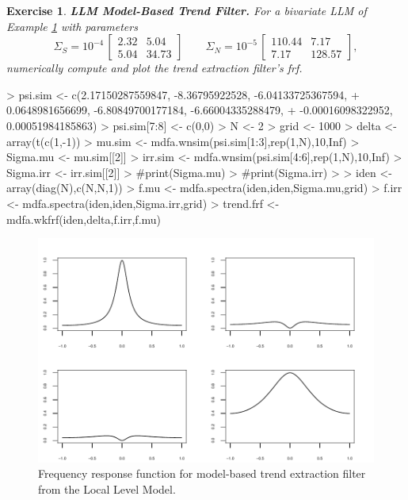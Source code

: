\documentclass[a4paper]{book}
\newtheorem{Exercise}{Exercise}
\begin{document}
\begin{Exercise} {\bf LLM Model-Based Trend Filter.} \rm
\label{exer:trend-i1}
 For a bivariate LLM of Example \ref{exer:trend-i1} with parameters 
\[
 \Sigma_{S} = 10^{-4} \,\left[ \begin{array}{ll} 
   2.32  &  5.04  \\
   5.04  & 34.73   \end{array}  \right]
 \qquad  \Sigma_{N} = 10^{-5} \, \left[ \begin{array}{ll}
        110.44   &  7.17  \\
        7.17     & 128.57   \end{array} \right],
\]
 numerically compute and plot the trend extraction filter's frf.
\end{Exercise}

\begin{Schunk}
\begin{Sinput}
> psi.sim <- c(2.17150287559847, -8.36795922528, -6.04133725367594, 
+              0.0648981656699, -6.80849700177184, -6.66004335288479, 
+              -0.00016098322952, 0.00051984185863)
> psi.sim[7:8] <- c(0,0)
> N <- 2
> grid <- 1000
> delta <- array(t(c(1,-1)) %
> mu.sim <- mdfa.wnsim(psi.sim[1:3],rep(1,N),10,Inf)
> Sigma.mu <- mu.sim[[2]]
> irr.sim <- mdfa.wnsim(psi.sim[4:6],rep(1,N),10,Inf)
> Sigma.irr <- irr.sim[[2]]
> #print(Sigma.mu)
> #print(Sigma.irr)
> 
> iden <- array(diag(N),c(N,N,1))
> f.mu <- mdfa.spectra(iden,iden,Sigma.mu,grid)
> f.irr <- mdfa.spectra(iden,iden,Sigma.irr,grid)
> trend.frf <- mdfa.wkfrf(iden,delta,f.irr,f.mu)
\end{Sinput}
\end{Schunk}



\begin{figure}[htb!]
\begin{center}
\includegraphics[]{llm_frf.pdf}
\caption{Frequency response function for model-based trend
 extraction filter from the Local Level Model.}
\label{fig:llm-frf}
\end{center}
\end{figure} 
\end{document}
